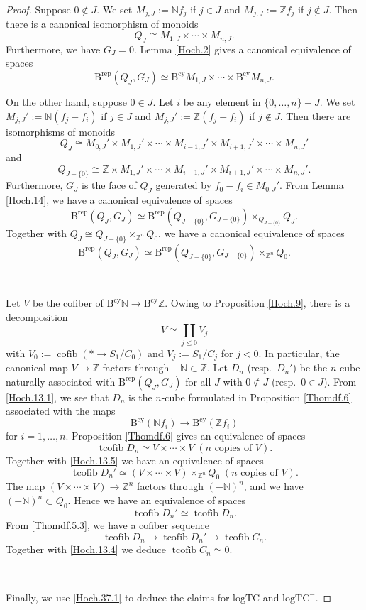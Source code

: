 \documentclass[11pt, a4paper]{amsart}
\theoremstyle{definition}
\numberwithin{equation}{subsection}
\newcommand{\N}{\mathbb{N}}
\newcommand{\Z}{\mathbb{Z}}
\newcommand{\Brep}{\operatorname{B^{rep}}}
\newcommand{\Bcy}{\operatorname{B^{cy}}}
\newcommand{\logTC}{\mathrm{logTC}}
\newcommand{\cofib}{\operatorname{cofib}}
\newcommand{\tcofib}{\operatorname{tcofib}}
\begin{document}
\begin{proof}
Suppose $0\notin J$.
We set $M_{j,J}:=\N f_j$ if $j\in J$ and $M_{j,J}:=\Z f_j$ if $j\notin J$.
Then there is a canonical isomorphism of monoids
\[
Q_J\cong M_{1,J}\times \cdots \times M_{n,J}.
\]
Furthermore, we have $G_J=0$.
Lemma \ref{Hoch.2} gives a canonical equivalence of spaces
\begin{equation}
\label{Hoch.13.1}
\Brep (Q_J,G_J)
\simeq
\Bcy M_{1,J}
\times
\cdots
\times
\Bcy M_{n,J}.
\end{equation}

On the other hand, suppose $0\in J$.
Let $i$ be any element in $\{0,\ldots,n\}-J$.
We set $M_{j,J}':=\N(f_j-f_i)$ if $j\in J$ and $M_{j,J}':=\Z(f_j-f_i)$ if $j\notin J$.
Then there are isomorphisms of monoids
\[
Q_J
\cong
M_{0,J}'\times M_{1,J}'\times \cdots \times M_{i-1,J}'\times M_{i+1,J}'\times \cdots \times M_{n,J}'
\]
and
\[
Q_{J-\{0\}}
\cong
\Z\times M_{1,J}'\times \cdots \times M_{i-1,J}'\times M_{i+1,J}'\times \cdots \times M_{n,J}'.
\]
Furthermore, $G_J$ is the face of $Q_J$ generated by $f_0-f_i\in M_{0,J}'$.
From Lemma \ref{Hoch.14}, we have a canonical equivalence of spaces
\begin{equation}
\label{Hoch.13.3}
\Brep (Q_J,G_J)
\simeq
\Brep (Q_{J-\{0\}},G_{J-\{0\}})\times_{Q_{J-\{0\}}}Q_J.
\end{equation}
Together with $Q_J\cong Q_{J-\{0\}}\times_{\Z^n} Q_0$, we have a canonical equivalence of spaces
\begin{equation}
\label{Hoch.13.5}
\Brep (Q_J,G_J)
\simeq
\Brep (Q_{J-\{0\}},G_{J-\{0\}}) \times_{\Z^n}Q_0.
\end{equation}

\

Let $V$ be the cofiber of $\Bcy \N\to \Bcy \Z$.
Owing to Proposition \ref{Hoch.9}, there is a decomposition
\[
V
\simeq
\coprod_{j\leq 0} V_j
\]
with $V_0:=\cofib(*\to S_1/C_0)$ and $V_j:=S_1/C_j$ for $j<0$.
In particular, the canonical map $V\to \Z$ factors through $-\N\subset \Z$.
Let $D_n$ (resp.\ $D_n'$) be the $n$-cube naturally associated with $\Brep (Q_J,G_J)$ for all $J$ with $0\notin J$ (resp.\ $0\in J$).
From \eqref{Hoch.13.1}, we see that $D_n$ is the $n$-cube formulated in Proposition \ref{Thomdf.6} associated with the maps
\[
\Bcy (\N f_i)
\to
\Bcy (\Z f_i)
\]
for $i=1,\ldots,n$.
Proposition \ref{Thomdf.6} gives an equivalence of spaces
\[
\tcofib D_n
\simeq
V\times \cdots \times V
\;
(n\text{ copies of }V).
\]
Together with \eqref{Hoch.13.5} we have an equivalence of spaces
\[
\tcofib D_n'
\simeq
(V\times \cdots \times V)\times_{\Z^n}Q_0
\;
(n\text{ copies of }V).
\]
The map $(V\times \cdots \times V)\to \Z^n$ factors through $(-\N)^n$, and we have $(-\N)^n\subset Q_0$.
Hence we have an equivalence of spaces
\begin{equation}
\label{Hoch.13.4}
\tcofib D_n'
\simeq
\tcofib D_n.
\end{equation}
From \eqref{Thomdf.5.3}, we have a cofiber sequence
\[
\tcofib D_n\to \tcofib D_n'\to \tcofib C_n.
\]
Together with \eqref{Hoch.13.4} we deduce $\tcofib C_n\simeq 0$.

\

Finally, we use \eqref{Hoch.37.1} to deduce the claims for $\logTC$ and $\logTC^-$.
\end{proof}
\end{document}
